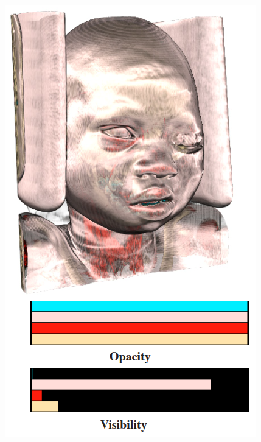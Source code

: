 \documentclass{egpubl}
\begin{document}
\begin{figure}
	\centering
	\begin{minipage}{.24\textwidth}
		\includegraphics[width=1\linewidth]{images/wang_efficient_2011_a}
	\end{minipage}~
	\begin{minipage}{.24\textwidth}

\end{minipage}
\end{figure}
\end{document}

